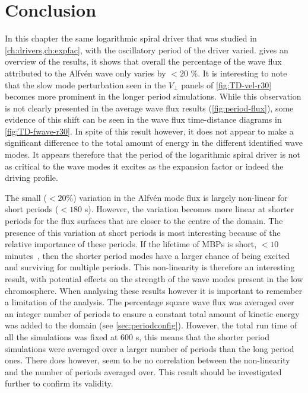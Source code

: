 \documentclass[a4paper,12pt,fourier,authoryear,custommargin]{Classes/PhDThesisPSnPDF}
\begin{document}
\section{Conclusion}\label{sec:conclusion}

In this chapter the same logarithmic spiral driver that was studied in \cref{ch:drivers,ch:expfac}, with the oscillatory period of the driver varied.
 gives an overview of the results, it shows that overall the percentage of the wave flux attributed to the Alfv\'en wave only varies by $<20$ \%.
It is interesting to note that the slow mode perturbation seen in the $V_\perp$ panels of \cref{fig:TD-vel-r30} becomes more prominent in the longer period simulations.
While this observation is not clearly presented in the average wave flux results (\cref{fig:period-flux}), some evidence of this shift can be seen in the wave flux time-distance diagrams in \cref{fig:TD-fwave-r30}.
In spite of this result however, it does not appear to make a significant difference to the total amount of energy in the different identified wave modes.
It appears therefore that the period of the logarithmic spiral driver is not as critical to the wave modes it excites as the expansion factor or indeed the driving profile.

The small ($<20$\%) variation in the Alfv\'en mode flux is largely non-linear for short periods ($<180$ s).
However, the variation becomes more linear at shorter periods for the flux surfaces that are closer to the centre of the domain.
The presence of this variation at short periods is most interesting because of the relative importance of these periods.
If the lifetime of MBPs is short, $<10$ minutes~\citep{sanchezalmeida2004}, then the shorter period modes have a larger chance of being excited and surviving for multiple periods.
This non-linearity is therefore an interesting result, with potential effects on the strength of the wave modes present in the low chromosphere.
When analysing these results however it is important to remember a limitation of the analysis.
The percentage square wave flux was averaged over an integer number of periods to ensure a constant total amount of kinetic energy was added to the domain (see \cref{sec:periodconfig}).
However, the total run time of all the simulations was fixed at $600$ s, this means that the shorter period simulations were averaged over a larger number of periods than the long period ones.
There does however, seem to be no correlation between the non-linearity and the number of periods averaged over.
This result should be investigated further to confirm its validity.
\end{document}
